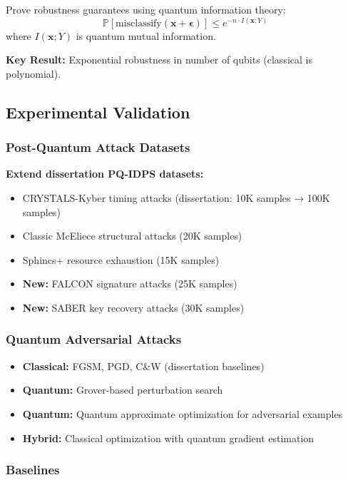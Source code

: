 \documentclass[11pt,letterpaper]{article}
\begin{document}
Prove robustness guarantees using quantum information theory:
\begin{equation}
\mathbb{P}[\text{misclassify}(\mathbf{x} + \boldsymbol{\epsilon})] \leq e^{-n \cdot I(\mathbf{x}; Y)}
\end{equation}
where $I(\mathbf{x}; Y)$ is quantum mutual information.

\textbf{Key Result:} Exponential robustness in number of qubits (classical is polynomial).

\subsection{Experimental Validation}

\subsubsection{Post-Quantum Attack Datasets}

\textbf{Extend dissertation PQ-IDPS datasets:}
\begin{itemize}
\item CRYSTALS-Kyber timing attacks (dissertation: 10K samples → 100K samples)
\item Classic McEliece structural attacks (20K samples)
\item Sphincs+ resource exhaustion (15K samples)
\item \textbf{New:} FALCON signature attacks (25K samples)
\item \textbf{New:} SABER key recovery attacks (30K samples)
\end{itemize}

\subsubsection{Quantum Adversarial Attacks}

\begin{itemize}
\item \textbf{Classical:} FGSM, PGD, C\&W (dissertation baselines)
\item \textbf{Quantum:} Grover-based perturbation search
\item \textbf{Quantum:} Quantum approximate optimization for adversarial examples
\item \textbf{Hybrid:} Classical optimization with quantum gradient estimation
\end{itemize}

\subsubsection{Baselines}
\end{document}
